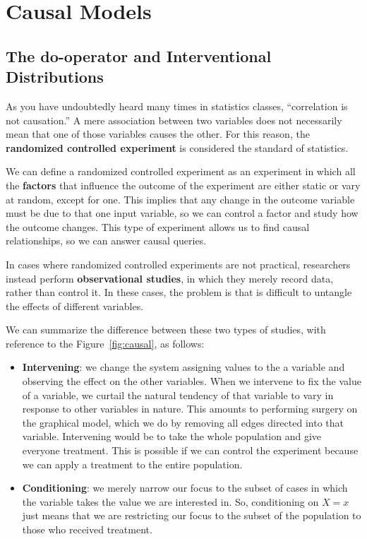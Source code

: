 \chapter{Causal Models}
\section{The do-operator and Interventional Distributions}
As you have undoubtedly heard many times in statistics classes, “correlation is
not causation.” A mere association between two variables does not necessarily
mean that one of those variables causes the other. For this reason, the
\textbf{randomized controlled experiment} is considered the standard of statistics.

We can define a randomized controlled experiment as an experiment in which all
the \textbf{factors} that influence the outcome of the experiment are either
static or vary at random, except for one. This implies that any change in the
outcome variable must be due to that one input variable, so we can control a factor
and study how the outcome changes. This type of experiment allows us to find causal
relationships, so we can answer causal queries.

In cases where randomized controlled experiments are not practical, researchers
instead perform \textbf{observational studies}, in which they merely record data,
rather than control it. In these cases, the problem is that is difficult to
untangle the effects of different variables.

We can summarize the difference between these two types of studies, with reference
to the Figure~\ref{fig:causal}, as follows:
\begin{itemize}
      \item \textbf{Intervening}: we change the system assigning values to the a
            variable and observing the effect on the other variables. When we
            intervene to fix the value of a variable, we curtail the natural
            tendency of that variable to vary in response to other variables in
            nature. This amounts to performing surgery on the graphical model,
            which we do by removing all edges directed into that variable.
            Intervening would be to take the whole population and give everyone
            treatment. This is possible if we can control the experiment because
            we can apply a treatment to the entire population.
      \item \textbf{Conditioning}: we merely narrow our focus to the subset of
            cases in which the variable takes the value we are interested in.
            So, conditioning on $X = x$ just means that we are restricting our
            focus to the subset of the population to those who received treatment.
\end{itemize}

